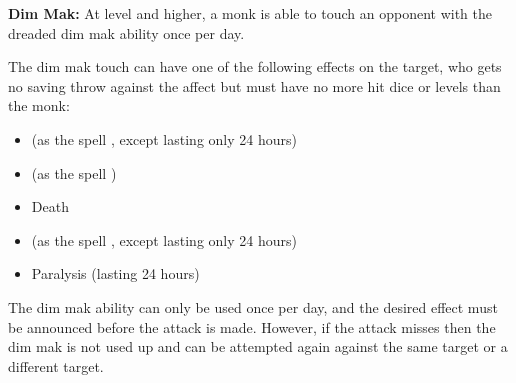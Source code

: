\begin{multicols*}{2}
\textbf{Dim Mak:} At  level and higher, a monk is able to touch an opponent with the dreaded dim mak ability once per day.

The dim mak touch can have one of the following effects on the target, who gets no saving throw against the affect but must have no more hit dice or levels than the monk:

\begin{itemize}
	\item{ (as the spell , except lasting only 24 hours)}
	\item{ (as the spell )}
	\item{Death}
	\item{ (as the spell , except lasting only 24 hours)}
	\item{Paralysis (lasting 24 hours)}
\end{itemize}

The dim mak ability can only be used once per day, and the desired effect must be announced before the attack is made. However, if the attack misses then the dim mak is not used up and can be attempted again against the same target or a different target.


\end{multicols*}
